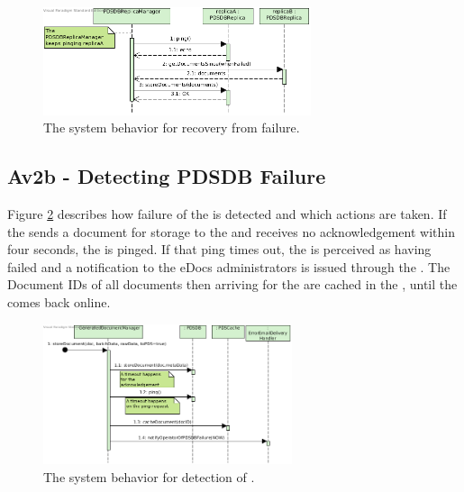 \begin{figure}[!htp]
    \centering
    \includegraphics[width=0.7\textwidth]{figures/Av2 - PDSDBReplica back on-line.png}
    \caption{The system behavior for recovery from  failure.
        }\label{fig:seq_av2online}
\end{figure}

\subsection{Av2b - Detecting PDSDB Failure}
Figure \ref{fig:seq_av2bfail} describes how failure of the  is detected and which actions are taken. If the  sends a document for storage to the  and receives no acknowledgement within four seconds, the  is pinged. If that ping times out, the  is perceived as having failed and a notification to the eDocs administrators is issued through the . The Document IDs of all documents then arriving for the  are cached in the , until the  comes back online.

\begin{figure}[!htp]
    \centering
    \includegraphics[width=0.65\textwidth]{figures/Av2b - Detecting PDSDB Failure.png}
    \caption{The system behavior for detection of .
        }\label{fig:seq_av2bfail}
\end{figure}

